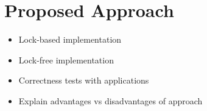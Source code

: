 \section{Proposed Approach}\label{sec:approach}





\begin{itemize}
	\item Lock-based implementation
	\item Lock-free implementation
	\item Correctness tests with applications
	\item Explain advantages vs disadvantages of approach
\end{itemize}